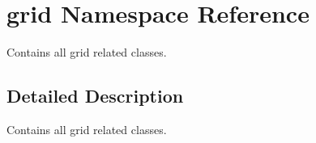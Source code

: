 \hypertarget{namespacegrid}{\section{grid Namespace Reference}
\label{namespacegrid}
}


Contains all grid related classes.  




\subsection{Detailed Description}
Contains all grid related classes. 